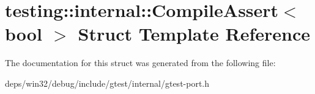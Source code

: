 \hypertarget{structtesting_1_1internal_1_1_compile_assert}{}\section{testing\+:\+:internal\+:\+:Compile\+Assert$<$ bool $>$ Struct Template Reference}
\label{structtesting_1_1internal_1_1_compile_assert}


The documentation for this struct was generated from the following file\+:\begin{DoxyCompactItemize}
\item 
deps/win32/debug/include/gtest/internal/gtest-\/port.\+h\end{DoxyCompactItemize}
